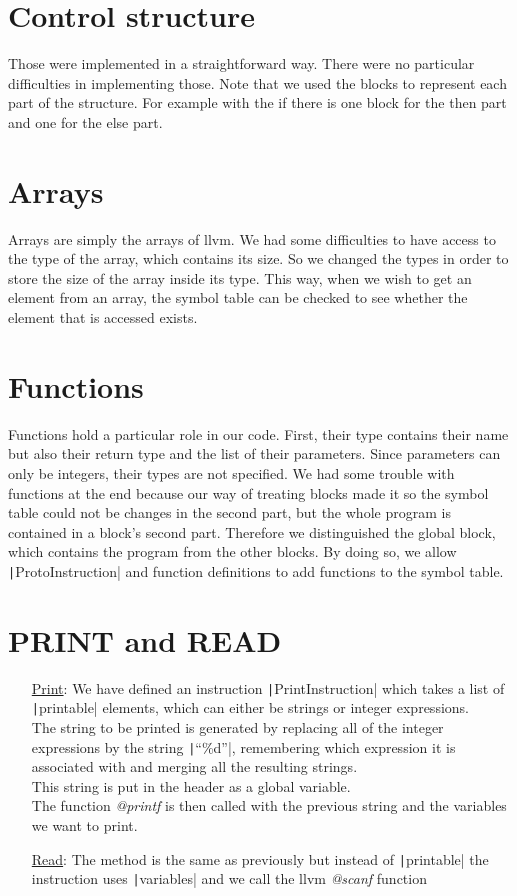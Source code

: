 \documentclass{article}
\newcommand{\code}[1]{\texttt|#1|}
\begin{document}
\section{Control structure}

Those were implemented in a straightforward way. There were no particular difficulties in implementing those. Note that we used the blocks to represent each part of the structure. For example with the if there is one block for the then part and one for the else part. 

\section{Arrays}

Arrays are simply the arrays of llvm. We had some difficulties to have access to the type of the array, which contains its size. So we changed the types in order to store the size of the array inside its type. This way, when we wish to get an element from an array, the symbol table can be checked to see whether the element that is accessed exists. 

\section{Functions}

Functions hold a particular role in our code. First, their type contains their name but also their return type and the list of their parameters. Since parameters can only be integers, their types are not specified. We had some trouble with functions at the end because our way of treating blocks made it so the symbol table could not be changes in the second part, but the whole program is contained in a block's second part. Therefore we distinguished the global block, which contains the program from the other blocks. By doing so, we allow \code{ProtoInstruction} and function definitions to add functions to the symbol table. 

\section{PRINT and READ}

\begin{itemize}
\item[\underline{Print}:] We have defined an instruction \code{PrintInstruction}
  which takes a list of \code{printable} elements, which can either be strings or integer expressions. \\
  The string to be printed is generated by replacing all of the integer expressions by the
  string \code{``\%d''}, remembering which expression it is associated with and merging all the resulting strings. \\
  This string is put in the header as a global variable. \\
  The function \emph{@printf} is then called with the previous string and the variables we want to print. 
\item[\underline{Read}:] The method is the same as previously but instead of
  \code{printable} the instruction uses \code{variables} and we call the llvm \emph{@scanf} function
\end{itemize}
\end{document}

